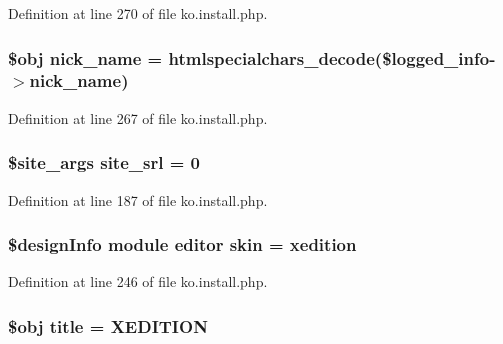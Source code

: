 Definition at line 270 of file ko.\+install.\+php.

\subsubsection[{\texorpdfstring{nick\+\_\+name}{nick_name}}]{\setlength{\rightskip}{0pt plus 5cm}\$obj nick\+\_\+name = htmlspecialchars\+\_\+decode(\$logged\+\_\+info-\/$>$nick\+\_\+name)}\hypertarget{ko_8install_8php_a151ecae87a1f3d7e257aa089803086bd}{}\label{ko_8install_8php_a151ecae87a1f3d7e257aa089803086bd}


Definition at line 267 of file ko.\+install.\+php.

\subsubsection[{\texorpdfstring{site\+\_\+srl}{site_srl}}]{\setlength{\rightskip}{0pt plus 5cm}\$site\+\_\+args site\+\_\+srl = 0}\hypertarget{ko_8install_8php_a8b1406b4ad1048041558dce6bfe89004}{}\label{ko_8install_8php_a8b1406b4ad1048041558dce6bfe89004}


Definition at line 187 of file ko.\+install.\+php.

\subsubsection[{\texorpdfstring{skin}{skin}}]{\setlength{\rightskip}{0pt plus 5cm}\$design\+Info {\bf module} {\bf editor} skin = \textquotesingle{}xedition\textquotesingle{}}\hypertarget{ko_8install_8php_ab0f2b49fdb57754496b34f6b880cdeaf}{}\label{ko_8install_8php_ab0f2b49fdb57754496b34f6b880cdeaf}


Definition at line 246 of file ko.\+install.\+php.

\subsubsection[{\texorpdfstring{title}{title}}]{\setlength{\rightskip}{0pt plus 5cm}\$obj title = \textquotesingle{}X\+E\+D\+I\+T\+I\+ON\textquotesingle{}}\hypertarget{ko_8install_8php_a5b072c5fd1d2228c6ba5cee13cd142e3}{}\label{ko_8install_8php_a5b072c5fd1d2228c6ba5cee13cd142e3}



